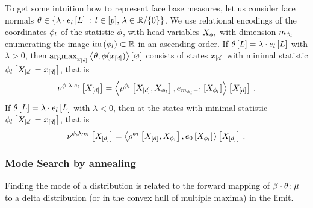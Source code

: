 \begin{example}
	To get some intuition how to represent face base measures, let us consider face normals $\theta\in\{\lambda\cdot e_{l}\left[L\right] \, : \, l\in[p], \, \lambda\in\mathbb{R}/\{0\}\}$.
	We use relational encodings of the coordinates $\phi_{l}$ of the statistic $\phi$, with head variables $X_{\phi_{l}}$ with dimension $m_{\phi_{l}}$ enumerating the image $\mathrm{im}\left(\phi_{l}\right)\subset\mathbb{R}$ in an ascending order.
	If $\theta\left[L\right]=\lambda\cdot e_{l}\left[L\right]$ with $\lambda>0$, then $\mathrm{argmax}_{x_{[d]}} \left\langle \theta,\phi(x_{[d]})\right\rangle \left[ \varnothing \right]$ consists of states $x_{[d]}$ with minimal statistic $\phi_{l}\left[X_{[d]}=x_{[d]}\right]$, that is
		\[  \nu^{\phi,\lambda\cdot e_{l}}\left[X_{[d]}\right]
		 = \left\langle \rho^{\phi_{l}}\left[X_{[d]},X_{\phi_{l}}\right],
		 e_{m_{\phi_{l}}-1}\left[X_{\phi_{l}}\right]\right\rangle \left[ X_{[d]} \right]  \, . \]		
	If $\theta\left[L\right]=\lambda\cdot e_{l}\left[L\right]$ with $\lambda<0$, then at the states with minimal statistic $\phi_{l}\left[X_{[d]}=x_{[d]}\right]$, that is
		\[  \nu^{\phi,\lambda\cdot e_{l}}\left[X_{[d]}\right]
		 = \left\langle \rho^{\phi_{l}}\left[X_{[d]},X_{\phi_{l}}\right],
		 e_{0}\left[X_{\phi_{l}}\right]\right\rangle \left[ X_{[d]} \right]  \, . \]
\end{example}


\subsubsection{Mode Search by annealing}

Finding the mode of a distribution is related to the forward mapping of $\beta\cdot\theta$: 
$\mu$ to a delta distribution (or in the convex hull of multiple maxima) in the limit.

